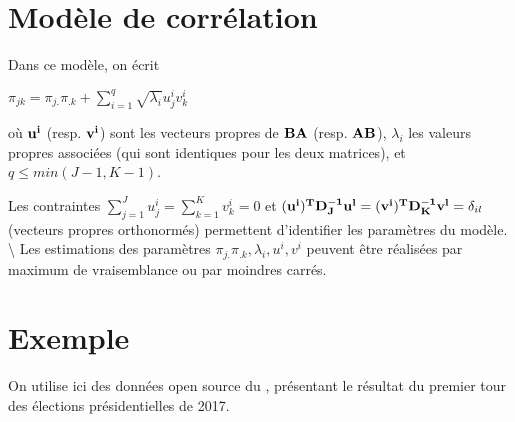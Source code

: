 \documentclass[letterpaper,10pt,english]{jupyterBook}
\begin{document}
\section{Modèle de corrélation}
\label{\detokenize{afc:modele-de-correlation}}
\sphinxAtStartPar
Dans ce modèle, on écrit

\sphinxAtStartPar
\(\pi_{jk} = \pi_{j.}\pi_{.k} + \displaystyle\sum_{i=1}^q \sqrt{\lambda_i} u^i_jv^i_k\)

\sphinxAtStartPar
où \({\bf u^i}\) (resp. \({\bf v^i}\)) sont les vecteurs propres de \({\bf BA}\) (resp. \({\bf AB}\)),  \(\lambda_i\) les valeurs propres associées (qui sont identiques pour les deux matrices), et \(q\leq min(J-1,K-1)\).

\sphinxAtStartPar
Les contraintes \(\displaystyle\sum_{j=1}^J u^i_j =  \displaystyle\sum_{k=1}^K v^i_k = 0\)  et \({\bf (u^i)^TD_J^{-1} u^l }= {\bf (v^i)^TD_K^{-1} v^l} = \delta_{il}\) (vecteurs propres orthonormés) permettent d’identifier les paramètres du modèle. \textbackslash{}
Les estimations des paramètres \(\pi_{j.}\pi_{.k} ,\lambda_i,u^i,v^i\) peuvent être réalisées par maximum de vraisemblance ou par moindres carrés.


\section{Exemple}
\label{\detokenize{afc:exemple}}
\sphinxAtStartPar
On utilise ici des données open source du , présentant le résultat du premier tour des élections présidentielles de 2017.
\end{document}
